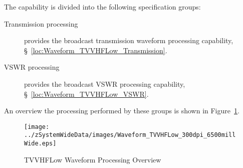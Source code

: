 The \ThisSys \ThisSegment \TVVHFLow capability is divided into the following specification groups:
\begin{description}
	\item[Transmission processing] provides the \TVVHFLow broadcast transmission waveform processing capability, \S~\ref{loc:Waveform_TVVHFLow_Transmission}.
	\item[VSWR processing]  provides the \TVVHFLow broadcast VSWR processing capability, \S~\ref{loc:Waveform_TVVHFLow_VSWR}.
\end{description}
An overview the processing performed by these groups is shown in Figure~\ref{fig:TVVHFLow_Waveform_Processing}.
\begin{figure}[htbp]
	\centering
		\texttt{[image: ../zSystemWideData/images/Waveform\_TVVHFLow\_300dpi\_6500millWide.eps]}
	\caption[TVVHFLow Waveform Processing Overview]{TVVHFLow Waveform Processing Overview}
	\label{fig:TVVHFLow_Waveform_Processing}
\end{figure}

%
%
%

